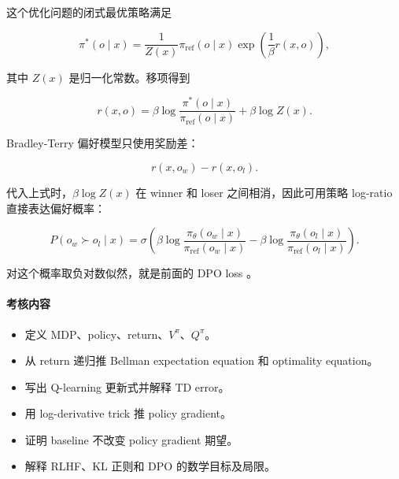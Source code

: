 \documentclass[11pt]{ctexart}
\begin{document}
这个优化问题的闭式最优策略满足

\[
  \pi^*(o\mid x)
  =
  \frac{1}{Z(x)}
  \pi_{\mathrm{ref}}(o\mid x)
  \exp\left(\frac{1}{\beta}r(x,o)\right),
\]

其中 \(Z(x)\) 是归一化常数。移项得到

\[
  r(x,o)
  =
  \beta
  \log
  \frac{\pi^*(o\mid x)}{\pi_{\mathrm{ref}}(o\mid x)}
  +
  \beta\log Z(x).
\]

Bradley-Terry 偏好模型只使用奖励差：

\[
  r(x,o_w)-r(x,o_l).
\]

代入上式时，\(\beta\log Z(x)\) 在 winner 和 loser 之间相消，因此可用策略 log-ratio 直接表达偏好概率：

\[
  P(o_w\succ o_l\mid x)
  =
  \sigma
  \left(
    \beta
    \log
    \frac{\pi_\theta(o_w\mid x)}{\pi_{\mathrm{ref}}(o_w\mid x)}
    -
    \beta
    \log
    \frac{\pi_\theta(o_l\mid x)}{\pi_{\mathrm{ref}}(o_l\mid x)}
  \right).
\]

对这个概率取负对数似然，就是前面的 DPO loss \parencite{rafailov2023dpo,jurafsky2026slp}。

\paragraph{考核内容}

\begin{itemize}
  \item 定义 MDP、policy、return、\(V^\pi\)、\(Q^\pi\)。
  \item 从 return 递归推 Bellman expectation equation 和 optimality equation。
  \item 写出 Q-learning 更新式并解释 TD error。
  \item 用 log-derivative trick 推 policy gradient。
  \item 证明 baseline 不改变 policy gradient 期望。
  \item 解释 RLHF、KL 正则和 DPO 的数学目标及局限。
\end{itemize}

\printbibliography[heading=bibintoc,title={参考文献与官方来源}]
\end{document}
